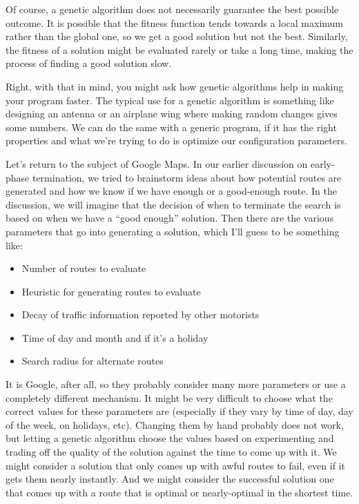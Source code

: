 \documentclass[a4paper]{report}
\begin{document}
Of course, a genetic algorithm does not necessarily guarantee the best possible outcome. It is possible that the fitness function tends towards a local maximum rather than the global one, so we get a good solution but not the best. Similarly, the fitness of a solution might be evaluated rarely or take a long time, making the process of finding a good solution slow.

Right, with that in mind, you might ask how genetic algorithms help in making your program faster. The typical use for a genetic algorithm is something like designing an antenna or an airplane wing where making random changes gives some numbers. We can do the same with a generic program, if it has the right properties and what we're trying to do is optimize our configuration parameters.

Let's return to the subject of Google Maps. In our earlier discussion on early-phase termination, we tried to brainstorm ideas about how potential routes are generated and how we know if we have enough or a good-enough route. In the discussion, we will imagine that the decision of when to terminate the search is based on when we have a ``good enough'' solution. Then there are the various parameters that go into generating a solution, which I'll guess to be something like:

\begin{itemize}
	\item Number of routes to evaluate
	\item Heuristic for generating routes to evaluate
	\item Decay of traffic information reported by other motorists
	\item Time of day and month and if it's a holiday
	\item Search radius for alternate routes
\end{itemize}

It is Google, after all, so they probably consider many more parameters or use a completely different mechanism. It might be very difficult to choose what the correct values for these parameters are (especially if they vary by time of day, day of the week, on holidays, etc). Changing them by hand probably does not work, but letting a genetic algorithm choose the values based on experimenting and trading off the quality of the solution against the time to come up with it. We might consider a solution that only comes up with awful routes to fail, even if it gets them nearly instantly. And we might consider the successful solution one that comes up with a route that is optimal or nearly-optimal in the shortest time.
\end{document}
